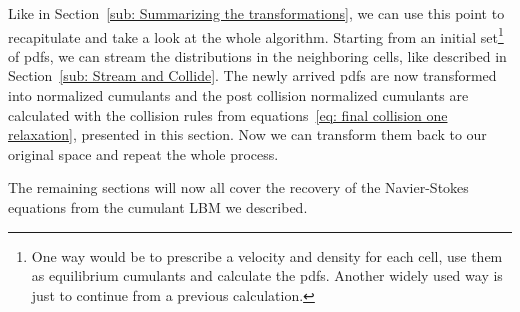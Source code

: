
Like in Section~\ref{sub: Summarizing the transformations}, we can use this point to recapitulate and take a look at the whole algorithm.
Starting from an initial set\footnote{
One way would be to prescribe a velocity and density for each cell, use them as equilibrium cumulants and calculate the \glspl{pdf}.
Another widely used way is just to continue from a previous calculation.
} of \glspl{pdf}, we can stream the distributions in the neighboring cells, like described in Section~\ref{sub: Stream and Collide}.
The newly arrived \glspl{pdf} are now transformed into normalized cumulants and the post collision normalized cumulants are calculated with the collision rules from equations~\eqref{eq: final collision one relaxation}, presented in this section.
Now we can transform them back to our original space and repeat the whole process.

The remaining sections will now all cover the recovery of the Navier-Stokes equations from the cumulant LBM we described.
